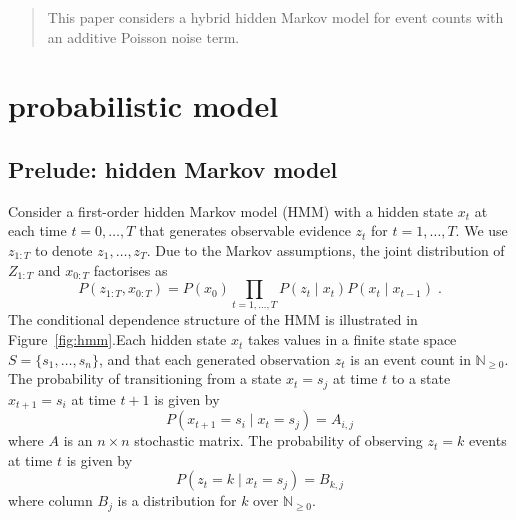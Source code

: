 \documentclass[twoside, 11pt]{article}
\newcommand{\nonnegint}[0] {\mathbb{N}_{\geq 0}}
\begin{document}


\author{\name Reuben Fletcher-Costin}

\title{}

\maketitle

\begin{abstract}%
This paper considers a hybrid hidden Markov model for event counts with an additive Poisson noise term. 
\end{abstract}

\section{probabilistic model}
\subsection{Prelude: hidden Markov model}

Consider a first-order hidden Markov model (HMM) with a hidden state $x_t$ at each time $t=0,\ldots,T$ that generates observable evidence $z_t$ for $t=1,\ldots,T$. We use $z_{1:T}$ to denote $z_1, \ldots, z_T$. Due to the Markov assumptions, the joint distribution of $Z_{1:T}$ and $x_{0:T}$ factorises as
\begin{equation}
P(z_{1:T}, x_{0:T}) = P(x_0) \prod_{t=1, \ldots, T} P(z_t \mid x_t) P(x_t \mid x_{t-1} ) \; .
\end{equation}
The conditional dependence structure of the HMM is illustrated in Figure~\ref{fig:hmm}.Each hidden state $x_t$ takes values in a finite state space $S = \{ s_1, \ldots, s_n \}$, and that each generated observation $z_t$ is an event count in $\nonnegint$. The probability of transitioning from a state $x_t=s_j$ at time $t$ to a state $x_{t+1}=s_i$ at time $t+1$ is given by
\begin{equation}
P(x_{t+1}=s_i \mid x_t=s_j) = A_{i,j}
\end{equation}
where $A$ is an $n \times n$ stochastic matrix. The probability of observing $z_t=k$ events at time $t$ is given by
\begin{equation}
P(z_t=k \mid x_t=s_j) = B_{k, j}
\end{equation}
where column $B_j$ is a distribution for $k$ over $\nonnegint$.

\end{document}
